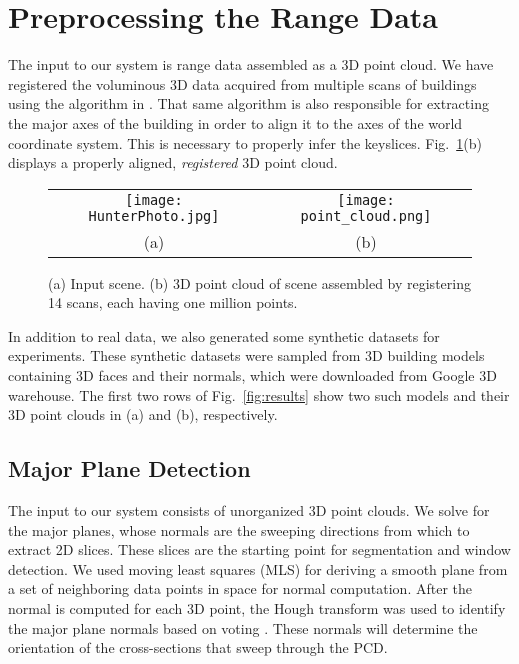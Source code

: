 \documentclass[10pt, conference, compsocconf]{IEEEtran}
\newcommand{\Fig}[1]{Fig.~\ref{fig:#1}}
\newcommand{\Figb}[1]{Fig.~\ref{fig:#1}(b)}
\begin{document}
\section{Preprocessing the Range Data}
\label{sec:prep}

The input to our system is range data assembled as a 3D point cloud.
We have registered the voluminous 3D data acquired from multiple scans of buildings
using the algorithm in \cite{Stamos08}.
That same algorithm is also responsible for extracting the major axes
of the building in order to align it to the axes of the world coordinate
system.
This is necessary to properly infer the keyslices.
\Figb{IR_2_DXF} displays a properly aligned, {\it registered} 3D point cloud.

\begin{figure}[htbp]
\begin{center}
\begin{tabular}{cc}
	\texttt{[image: HunterPhoto.jpg]} &
	\texttt{[image: point\_cloud.png]} \\
	(a) & (b) \\
\end{tabular}
\end{center}
\caption{
(a) Input scene.
(b) 3D point cloud of scene assembled by registering 14 scans, each having
one million points.
}
\label{fig:IR_2_DXF}
\end{figure}

In addition to real data, we also generated some synthetic datasets for experiments.
These synthetic datasets were sampled from 3D building models
containing 3D faces and their normals,
which were downloaded from Google 3D warehouse.
The first two rows of \Fig{results} show two such models and their 3D point
clouds in (a) and (b), respectively.

\subsection{Major Plane Detection}
\label{sec:major_plane}

The input to our system consists of unorganized 3D point clouds.
We solve for the major planes, whose normals are the sweeping directions
from which to extract 2D slices.
These slices are the starting point for segmentation and window detection.
We used moving least squares (MLS) for deriving a smooth plane from a set
of neighboring data points in space for normal computation.
After the normal is computed for each 3D point, the Hough transform was used
to identify the major plane normals based on voting \cite{MLS01}.
These normals will determine the orientation of the cross-sections that
sweep through the PCD.
\end{document}
